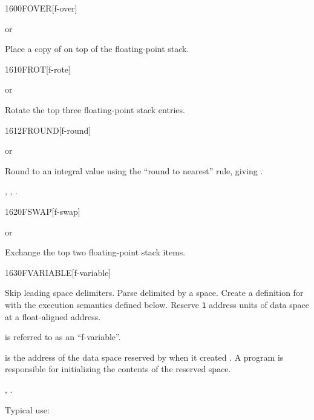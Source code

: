 \vspace*{-1ex}
\enlargethispage{10ex}
\begin{worddef}{1600}{FOVER}[f-over]
\item {} or

	Place a copy of  on top of the floating-point stack.
\end{worddef}

\vspace*{-1ex}
\begin{worddef}{1610}{FROT}[f-rote]
\item {} or

	Rotate the top three floating-point stack entries.
\end{worddef}


\begin{worddef}{1612}{FROUND}[f-round]
\item {} or

	Round  to an integral value using the ``round to nearest''
	rule, giving .

\see {},
	, .
\end{worddef}


\vspace*{-0.5ex}
\begin{worddef}{1620}{FSWAP}[f-swap]
\item {} or

	Exchange the top two floating-point stack items.
\end{worddef}


\vspace*{-0.5ex}
\begin{worddef}{1630}{FVARIABLE}[f-variable]
\item {}

	Skip leading space delimiters. Parse  delimited by a
	space. Create a definition for  with the execution
	semantics defined below. Reserve \texttt{1} 
	address units of data space at a float-aligned address.

	 is referred to as an ``f-variable''.

\execute[name]

	 is the address of the data space reserved by
	 when it created . A program is
	responsible for initializing the contents of the reserved
	space.

\see {},
	.

	\begin{rationale} %
		Typical use:
			 
	\end{rationale}
\end{worddef}

